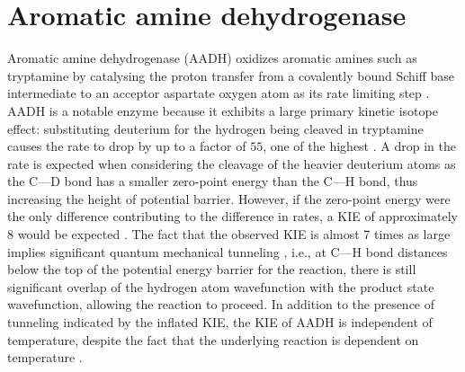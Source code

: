 
\section{Aromatic amine dehydrogenase}
Aromatic amine dehydrogenase (AADH) oxidizes aromatic amines such as tryptamine by catalysing the proton transfer from a covalently bound Schiff base intermediate to an acceptor aspartate oxygen atom as its rate limiting step \cite{masgrauAtomicDescriptionEnzyme2006}.  AADH is a notable enzyme because it exhibits a large primary kinetic isotope effect: substituting deuterium for the hydrogen being cleaved in tryptamine causes the rate to drop by up to a factor of $55$, one of the highest \cite{masgrauAtomicDescriptionEnzyme2006}.  A drop in the rate is expected when considering the cleavage of the heavier deuterium atoms as the C---D bond has a smaller zero-point energy than the C---H bond, thus increasing the height of potential barrier. However, if the zero-point energy were the only difference contributing to the difference in rates, a KIE of approximately \num{8} would be expected \cite{antoniouLargeKineticIsotope1997}.  The fact that the observed KIE is almost \num{7} times as large implies significant quantum mechanical tunneling \cite{masgrauAtomicDescriptionEnzyme2006, klinmanbeyond2009, basranImportanceBarrierShape2001a}, i.e., at C---H bond distances below the top of the potential energy barrier for the reaction, there is still significant overlap of the hydrogen atom wavefunction with the product state wavefunction, allowing the reaction to proceed.  In addition to the presence of tunneling indicated by the inflated KIE, the KIE of AADH is independent of temperature, despite the fact that the underlying reaction is dependent on temperature \cite{masgrauAtomicDescriptionEnzyme2006}. 

